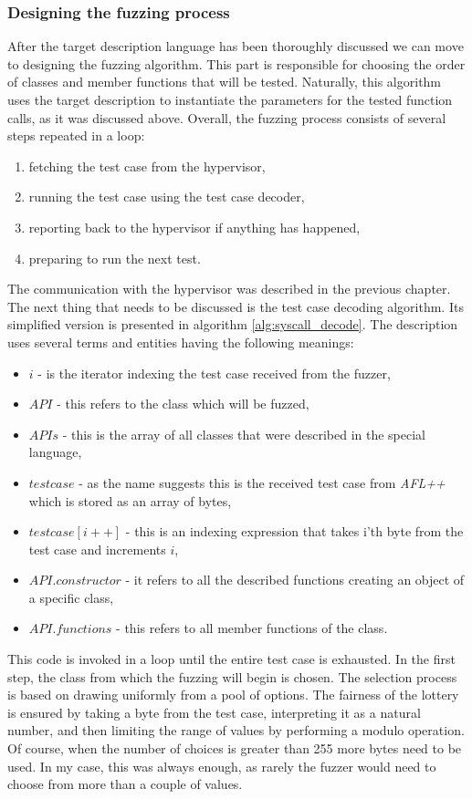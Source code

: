 \subsubsection{Designing the fuzzing process} \label{sec:testcase}
After the target description language has been thoroughly discussed we can move to designing the fuzzing algorithm. This part is responsible for choosing the order of classes and member functions that will be tested. Naturally, this algorithm uses the target description to instantiate the parameters for the tested function calls, as it was discussed above.
Overall, the fuzzing process consists of several steps repeated in a loop:
\begin{enumerate}
    \item fetching the test case from the hypervisor,
    \item running the test case using the test case decoder,
    \item reporting back to the hypervisor if anything has happened,
    \item preparing to run the next test.
\end{enumerate}
The communication with the hypervisor was described in the previous chapter. The next thing that needs to be discussed is the test case decoding algorithm. Its simplified version is presented in algorithm \ref{alg:syscall_decode}. The description uses several terms and entities having the following meanings:
\begin{itemize}
    \item $i$ - is the iterator indexing the test case received from the fuzzer,
    \item $API$ - this refers to the class which will be fuzzed,
    \item $APIs$ - this is the array of all classes that were described in the special language,
    \item $testcase$ - as the name suggests this is the received test case from \textit{AFL++} which is stored as an array of bytes,
    \item $testcase[i++]$ - this is an indexing expression that takes i'th byte from the test case and increments $i$,
    \item $API.constructor$ - it refers to all the described functions creating an object of a specific class,
    \item $API.functions$ - this refers to all member functions of the class.
\end{itemize}
This code is invoked in a loop until the entire test case is exhausted. In the first step, the class from which the fuzzing will begin is chosen. The selection process is based on drawing uniformly from a pool of options. The fairness of the lottery is ensured by taking a byte from the test case, interpreting it as a natural number, and then limiting the range of values by performing a modulo operation. Of course, when the number of choices is greater than 255 more bytes need to be used. In my case, this was always enough, as rarely the fuzzer would need to choose from more than a couple of values. 
